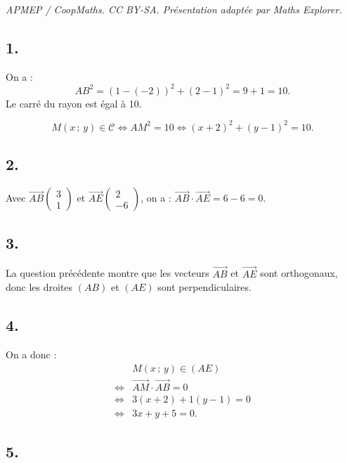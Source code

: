 \documentclass[10pt]{article}
\begin{document}
\noindent\textit{APMEP / CoopMaths. CC BY-SA. Présentation adaptée par Maths Explorer.}\par\medskip
\subsection*{1.}

On a :
\[
AB^2 = (1 - (-2))^2 + (2 - 1)^2 = 9 + 1 = 10.
\]
Le carré du rayon est égal à 10.

\[
M(x\,;\,y) \in \mathcal{C} \iff AM^2 = 10 \iff (x + 2)^2 + (y - 1)^2 = 10.
\]

\subsection*{2.}

Avec \(\overrightarrow{AB} \begin{pmatrix} 3 \\ 1 \end{pmatrix}\) et \(\overrightarrow{AE} \begin{pmatrix} 2 \\ -6 \end{pmatrix}\), on a :
\(\overrightarrow{AB} \cdot \overrightarrow{AE} = 6 - 6 = 0\).

\subsection*{3.}

La question précédente montre que les vecteurs \(\overrightarrow{AB}\) et \(\overrightarrow{AE}\) sont orthogonaux, donc les droites \((AB)\) et \((AE)\) sont perpendiculaires.

\subsection*{4.}

On a donc :
\begin{align*}
&M(x\,;\,y) \in (AE) \\
\iff &\overrightarrow{AM} \cdot \overrightarrow{AB} = 0 \\
\iff &3(x + 2) + 1(y - 1) = 0 \\
\iff &3x + y + 5 = 0.
\end{align*}

\subsection*{5.}
\end{document}
